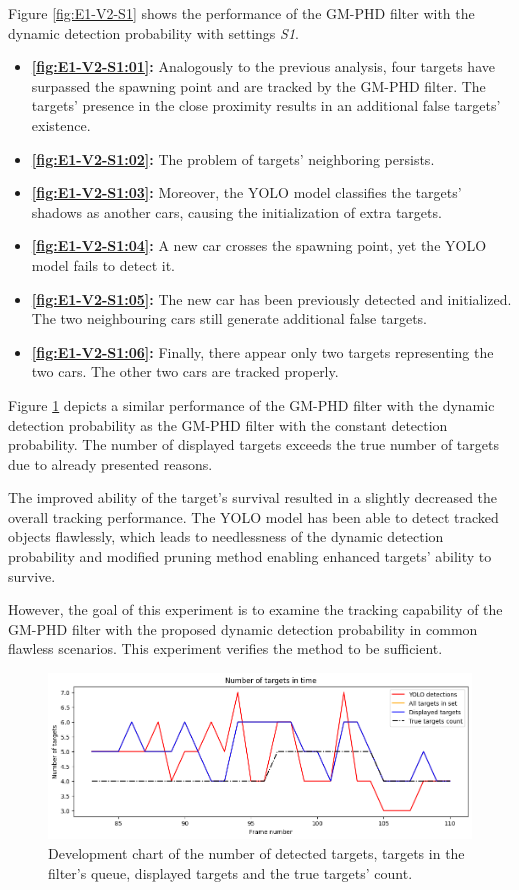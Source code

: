 Figure \ref{fig:E1-V2-S1} shows the performance of the GM-PHD filter with the dynamic detection probability with settings \textit{S1}.
\begin{itemize}
    \item \textbf{\ref{fig:E1-V2-S1:01}:} Analogously to the previous analysis, four targets have surpassed the
    spawning point and are tracked by the GM-PHD filter. The targets' presence in the close proximity results in an
    additional false targets' existence.
    \item \textbf{\ref{fig:E1-V2-S1:02}:} The problem of targets' neighboring persists.
    \item \textbf{\ref{fig:E1-V2-S1:03}:} Moreover, the YOLO model classifies the targets' shadows as another cars,
    causing the initialization of extra targets.
    \item \textbf{\ref{fig:E1-V2-S1:04}:} A new car crosses the spawning point, yet the YOLO model fails to detect it.
    \item \textbf{\ref{fig:E1-V2-S1:05}:} The new car has been previously detected and
    initialized. The two
    neighbouring cars still generate additional false targets.
    \item \textbf{\ref{fig:E1-V2-S1:06}:} Finally, there appear only two targets representing the two cars. The other
    two
    cars are tracked properly.
\end{itemize}

Figure \ref{gr:E1-V2-S1} depicts a similar performance of the GM-PHD filter with the dynamic detection probability as
the GM-PHD filter with the constant detection probability. The number of displayed targets exceeds the true number of
targets due to already presented reasons.


The improved ability of the target's survival resulted in a slightly decreased the overall tracking performance. The
YOLO model
has been able to detect tracked objects flawlessly, which leads to needlessness of the dynamic detection
probability
and modified pruning method enabling enhanced targets' ability to survive.

However, the goal of this experiment is to examine the tracking capability of the GM-PHD filter with the proposed
dynamic
detection probability in common flawless scenarios. This experiment verifies the method to be sufficient.

\begin{figure}[H]
    \centering
    \includegraphics[width=\linewidth]{../../../experiments/E1/V2/YOLO/yolo_det}
    \caption{Development chart of the number of detected targets, targets in the filter's queue, displayed targets
    and the
    true targets' count.}
    \label{gr:E1-V2-S1}
\end{figure}

